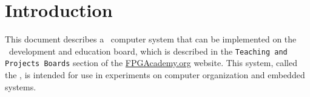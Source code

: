 \section{Introduction}
This document describes a \processor~computer system that can be implemented
on the \DEBoard~development and education board, which
is described in the \texttt{Teaching and Projects Boards} 
section of the {\small \href{https://www.fpgacademy.org/boards.html} {FPGAcademy.org}} website. 
This system, called the {\it \systemNameFull}, is intended for use in
experiments on computer organization and embedded
systems. 

